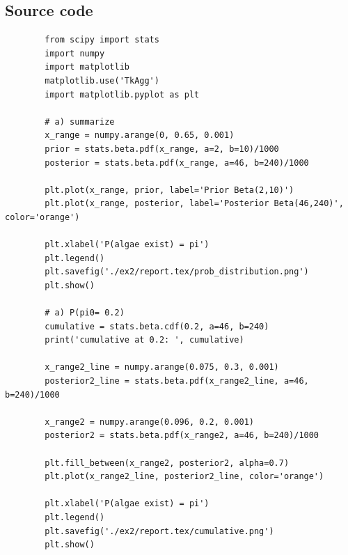 \documentclass[11pt,a4paper,english]{article}
\begin{document}
    \begin{appendices}
      \section{Source code}
      \begin{verbatim}
        from scipy import stats
        import numpy
        import matplotlib
        matplotlib.use('TkAgg')
        import matplotlib.pyplot as plt

        # a) summarize
        x_range = numpy.arange(0, 0.65, 0.001)
        prior = stats.beta.pdf(x_range, a=2, b=10)/1000
        posterior = stats.beta.pdf(x_range, a=46, b=240)/1000

        plt.plot(x_range, prior, label='Prior Beta(2,10)')
        plt.plot(x_range, posterior, label='Posterior Beta(46,240)', color='orange')

        plt.xlabel('P(algae exist) = pi')
        plt.legend()
        plt.savefig('./ex2/report.tex/prob_distribution.png')
        plt.show()

        # a) P(pi0= 0.2)
        cumulative = stats.beta.cdf(0.2, a=46, b=240)
        print('cumulative at 0.2: ', cumulative)

        x_range2_line = numpy.arange(0.075, 0.3, 0.001)
        posterior2_line = stats.beta.pdf(x_range2_line, a=46, b=240)/1000

        x_range2 = numpy.arange(0.096, 0.2, 0.001)
        posterior2 = stats.beta.pdf(x_range2, a=46, b=240)/1000

        plt.fill_between(x_range2, posterior2, alpha=0.7)
        plt.plot(x_range2_line, posterior2_line, color='orange')

        plt.xlabel('P(algae exist) = pi')
        plt.legend()
        plt.savefig('./ex2/report.tex/cumulative.png')
        plt.show()
      \end{verbatim}
    \end{appendices}
\end{document}
